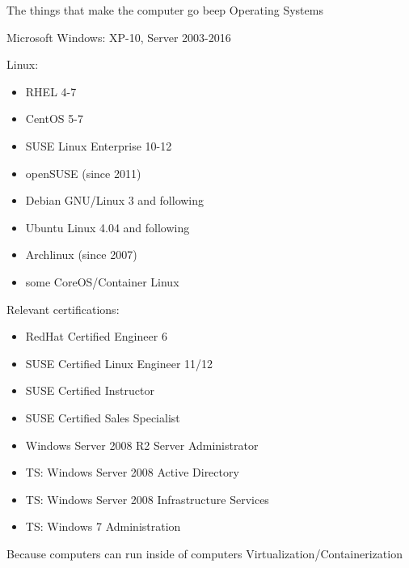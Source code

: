 

\begin{cventries}
  \cventry
    {The things that make the computer go beep}
    {Operating Systems}
		{}
    {}
    {
			\begin{cvitems}
				\item Microsoft Windows: XP-10, Server 2003-2016
				\item Linux:
          \begin{itemize}
            \item RHEL 4-7
            \item CentOS 5-7
            \item SUSE Linux Enterprise 10-12
            \item openSUSE (since 2011)
            \item Debian GNU/Linux 3 and following
            \item Ubuntu Linux 4.04 and following
            \item Archlinux (since 2007)
            \item some CoreOS/Container Linux
          \end{itemize}
        \item Relevant certifications:
          \begin{itemize}
            \item RedHat Certified Engineer 6
            \item SUSE Certified Linux Engineer 11/12
            \item SUSE Certified Instructor
            \item SUSE Certified Sales Specialist
            \item Windows Server 2008 R2 Server Administrator
            \item TS: Windows Server 2008 Active Directory
            \item TS: Windows Server 2008 Infrastructure Services
            \item TS: Windows 7 Administration
          \end{itemize}
      \end{cvitems}
    }
  \cventry
    {Because computers can run inside of computers}
    {Virtualization/Containerization}
    {}
    {}
    {
      \begin{cvitems}

\end{cvitems}}
\end{cventries}
